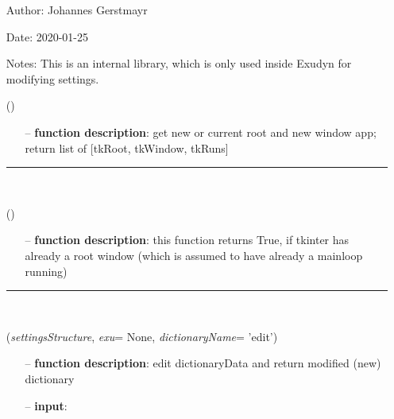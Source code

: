 \begin{itemize}[leftmargin=1.4cm]
\begin{itemize}[leftmargin=1.4cm]
\begin{itemize}[leftmargin=0.5cm]
\begin{itemize}[leftmargin=1.4cm]
\begin{itemize}[leftmargin=1.4cm]
\begin{itemize}[leftmargin=0.5cm]
\begin{itemize}[leftmargin=1.4cm]
\begin{itemize}[leftmargin=0.5cm]
\begin{itemize}[leftmargin=1.4cm]
\setlength{\itemindent}{-1.4cm}
\item[]Author:    Johannes Gerstmayr
\item[]Date:      2020-01-25
\item[]Notes: 	This is an internal library, which is only used inside Exudyn for modifying settings.
\ei
\begin{flushleft}
\label{sec:GUI:GetTkRootAndNewWindow}
()
\end{flushleft}
\setlength{\itemindent}{0.7cm}
\begin{itemize}[leftmargin=0.7cm]
\item[--]{\bf function description}: get new or current root and new window app; return list of [tkRoot, tkWindow, tkRuns]
\vspace{12pt}\end{itemize}
%
\noindent\rule{8cm}{0.75pt}\vspace{1pt} \\ 
\begin{flushleft}
\label{sec:GUI:TkRootExists}
()
\end{flushleft}
\setlength{\itemindent}{0.7cm}
\begin{itemize}[leftmargin=0.7cm]
\item[--]{\bf function description}: this function returns True, if tkinter has already a root window (which is assumed to have already a mainloop running)
\vspace{12pt}\end{itemize}
%
\noindent\rule{8cm}{0.75pt}\vspace{1pt} \\ 
\begin{flushleft}
\label{sec:GUI:EditDictionaryWithTypeInfo}
({\it settingsStructure}, {\it exu}= None, {\it dictionaryName}= 'edit')
\end{flushleft}
\setlength{\itemindent}{0.7cm}
\begin{itemize}[leftmargin=0.7cm]
\item[--]{\bf function description}: edit dictionaryData and return modified (new) dictionary
\item[--]{\bf input}: \vspace{-6pt}

\end{itemize}
\end{itemize}
\end{itemize}
\end{itemize}
\end{itemize}
\end{itemize}
\end{itemize}
\end{itemize}
\end{itemize}
\end{itemize}
